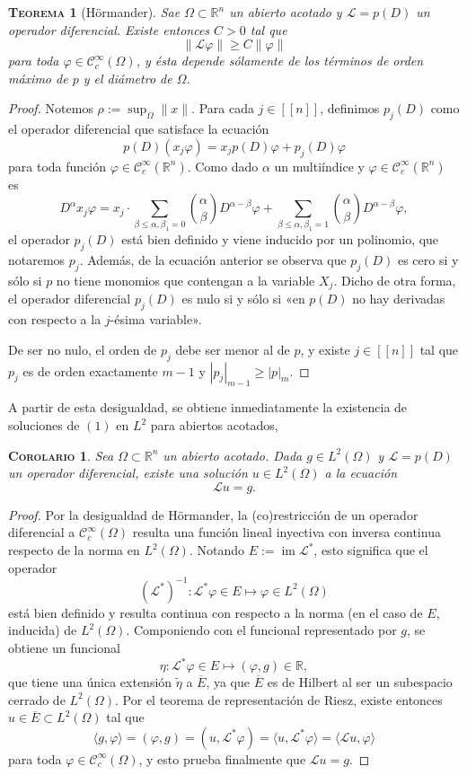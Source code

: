 \documentclass[11pt]{article}
\theoremstyle{colored}
\newtheorem{theorem}{\scshape Teorema}
\newtheorem{corollary}{\scshape Corolario}
\newcommand{\R}{\mathbb{R}}
\newcommand{\C}{\mathscr{C}}
\newcommand{\im}{\operatorname{im}}
\newcommand{\nat}[1]{[\![#1]\!]}
\newcommand{\ev}[1]{\langle #1 \rangle}
\newcommand{\ip}[1]{( #1 )}
\newcommand{\guill}[1]{«#1»}
\renewcommand{\L}{\mathscr{L}}
\begin{document}
\begin{theorem}[Hörmander] Sae $\Omega \subset \R^n$ un abierto acotado y $\L = p(D)$ un operador diferencial. Existe entonces $C > 0$ tal que
\[
\|\L\varphi\| \geq C\|\varphi\|
\]
para toda $\varphi \in \mathscr{C}_c^\infty(\Omega)$, y ésta depende sólamente de los términos de orden máximo de $p$ y el diámetro de $\Omega$.
\end{theorem}
\begin{proof} Notemos $\rho := \sup_{\Omega}\|x\|$. Para cada $j \in \nat{n}$, definimos $p_j(D)$ como el operador diferencial que satisface la ecuación
\[
p(D)(x_j\varphi) = x_jp(D)\varphi + p_j(D)\varphi
\]
para toda función $\varphi \in \C_c^\infty(\R^n)$. Como dado $\alpha$ un multiíndice y $\varphi \in \C_c^\infty(\R^n)$ es
\[
D^\alpha x_j\varphi = x_j \cdot \sum_{\beta \leq \alpha, \beta_1 = 0} {\alpha \choose \beta} D^{\alpha - \beta}\varphi + \sum_{\beta \leq \alpha, \beta_1 = 1} {\alpha \choose \beta}D^{\alpha - \beta}\varphi,
\]
el operador $p_j(D)$ está bien definido y viene inducido por un polinomio, que notaremos $p_j$. Además, de la ecuación anterior se observa que $p_j(D)$ es cero si y sólo si $p$ no tiene monomios que contengan a la variable $X_j$. Dicho de otra forma, el operador diferencial $p_j(D)$ es nulo si y sólo si \guill{en $p(D)$ no hay derivadas con respecto a la $j$-ésima variable}.

De ser no nulo, el orden de $p_j$ debe ser menor al de $p$, y existe $j \in \nat{n}$ tal que $p_j$ es de orden exactamente $m-1$ y $|p_j|_{m-1} \geq |p|_m$.
\end{proof}

A partir de esta desigualdad, se obtiene inmediatamente la existencia de soluciones de $(1)$ en $L^2$ para abiertos acotados,

\begin{corollary} Sea $\Omega \subset \R^n$ un abierto acotado. Dada $g \in L^2(\Omega)$ y $\L = p(D)$ un operador diferencial, existe una solución $u \in L^2(\Omega)$ a la ecuación
\[
\L u = g.
\]
\end{corollary}
\begin{proof} Por la desigualdad de Hörmander, la (co)restricción de un operador diferencial a $\C_c^\infty(\Omega)$ resulta una función lineal inyectiva con inversa continua respecto de la norma en $L^2(\Omega)$. Notando $E := \im \L^\ast$, esto significa que el operador
\[
(\L^\ast)^{-1} : \L^\ast \varphi \in E \mapsto \varphi \in L^2(\Omega)
\]
está bien definido y resulta continua con respecto a la norma (en el caso de $E$, inducida) de $L^2(\Omega)$. Componiendo con el funcional representado por $g$, se obtiene un funcional
\[
\eta  : \L^\ast\varphi \in E \mapsto \ip{\varphi, g} \in \R,
\]
que tiene una única extensión $\widetilde{\eta}$ a $\overline{E}$, ya que $\overline{E}$ es de Hilbert al ser un subespacio cerrado de $L^2(\Omega)$. Por el teorema de representación de Riesz, existe entonces $u \in \overline{E} \subset L^2(\Omega)$ tal que
\[
\ev{g,\varphi} = (\varphi,g) = (u,\L^\ast\varphi) = \ev{u,\L^\ast\varphi} = \ev{\L u, \varphi}
\]
para toda $\varphi \in \C_c^\infty(\Omega)$, y esto prueba finalmente que $\L u = g$.
\end{proof}
\end{document}

